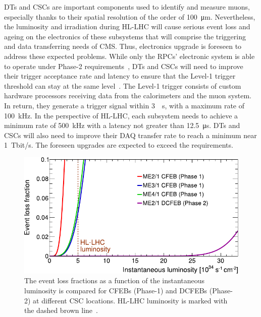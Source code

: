 	\acl{DT}s and \acl{CSC}s are important components used to identify and measure muons, especially thanks to their spatial resolution of the order of \SI{100}{\micro m}. Nevertheless, the luminosity and irradiation during HL-LHC will cause serious event loss and ageing on the electronics of these subsystems that will comprise the triggering and data transferring needs of CMS. Thus, electronics upgrade is foreseen to address these expected problems. While only the RPCs' electronic system is able to operate under Phase-2 requirements~\cite{CMSIITP}, DTs and CSCs will need to improve their trigger acceptance rate and latency to ensure that the Level-1 trigger threshold can stay at the same level~\cite{LEVEL1IR}. The Level-1 trigger consists of custom hardware processors receiving data from the calorimeters and the muon system. In return, they generate a trigger signal within \SI{3}{\mu s}, with a maximum rate of \SI{100}{kHz}. In the perspective of HL-LHC, each subsystem needs to achieve a minimum rate of \SI{500}{kHz} with a latency not greater than \SI{12.5}{\micro s}. DTs and CSCs will also need to improve their \acf{DAQ} transfer rate to reach a minimum near \SI{1}{Tbit/s}. The foreseen upgrades are expected to exceed the requirements.
	
\endgroup

\begingroup\setlength{\intextsep}{0pt}\setlength{\columnsep}{15pt}

	\begin{figure}
		\centering
		\includegraphics[width=\linewidth]{fig/chapt4/CSC-event-loss.pdf}
		\caption{\label{fig:CSC-event-loss} The event loss fractions as a function of the instantaneous luminosity is compared for CFEBs (Phase-1) and DCFEBs (Phase-2) at different CSC locations. HL-LHC luminosity is marked with the dashed brown line~\cite{PHASEIITP}.}
	\end{figure}
	
